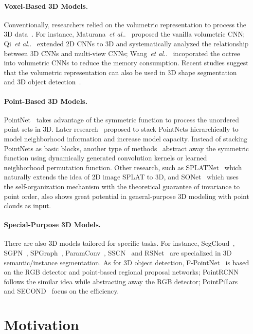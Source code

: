 \documentclass{article}
\makeatletter
\DeclareRobustCommand\onedot{\futurelet\@let@token\@onedot}
\def\@onedot{\ifx\@let@token.\else.\null\fi\xspace}
\def\etal{\emph{et al}\onedot}
\newcommand{\myparagraph}[1]{\vspace{-6pt}\paragraph{#1}}
\makeatother
\begin{document}
\myparagraph{Voxel-Based 3D Models.}

Conventionally, researchers relied on the volumetric representation to process the 3D data~\cite{Wu:2015mn}. For instance, Maturana~\etal~\cite{Maturana:2015vn} proposed the vanilla volumetric CNN; Qi~\etal~\cite{Qi:2016vm} extended 2D CNNs to 3D and systematically analyzed the relationship between 3D CNNs and multi-view CNNs; Wang~\etal~\cite{Wang:2017td} incoporated the octree into volumetric CNNs to reduce the memory consumption. Recent studies suggest that the volumetric representation can also be used in 3D shape segmentation~\cite{Tatarchenko:2017oc,Wang:2019vs, Le:2018pg} and 3D object detection~\cite{Zhou:2018vn}.

\myparagraph{Point-Based 3D Models.}

PointNet~\cite{Qi:2017vq} takes advantage of the symmetric function to process the unordered point sets in 3D. Later research~\cite{Qi:2017tf,Klokov:2017te, Wang:2018dg} proposed to stack PointNets hierarchically to model neighborhood information and increase model capacity. Instead of stacking PointNets as basic blocks, another type of methods~\cite{Li:2018tp,Lan:2019ge, Xu:2018sp} abstract away the symmetric function using dynamically generated convolution kernels or learned neighborhood permutation function. Other research, such as SPLATNet~\cite{Su:2018sp}  which naturally extends the idea of 2D image SPLAT to 3D, and SONet~\cite{Li:2018so} which uses the self-organization mechanism with the theoretical guarantee of invariance to point order, also shows great potential in general-purpose 3D modeling with point clouds as input. 

\myparagraph{Special-Purpose 3D Models.}

There are also 3D models tailored for specific tasks. For instance, SegCloud~\cite{Tchapmi:2017sc}, SGPN~\cite{Wang:2018sg}, SPGraph~\cite{Landrieu:2018sp}, ParamConv~\cite{Wang:2018pc}, SSCN~\cite{Graham:2018ss} and RSNet~\cite{Huang:2018rs} are specialized in 3D semantic/instance segmentation. As for 3D object detection, F-PointNet~\cite{Qi:2018fd} is based on the RGB detector and point-based regional proposal networks; PointRCNN~\cite{Shi:2019pr} follows the similar idea while abstracting away the RGB detector; PointPillars~\cite{Lang:2019pp} and SECOND~\cite{Yan:2018se} focus on the efficiency.



 \section{Motivation}
\label{sec:motivation}
\end{document}
